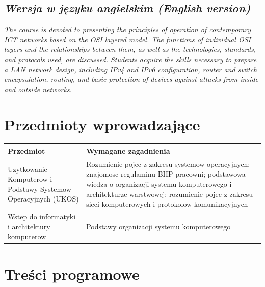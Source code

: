 \documentclass[12pt, a4paper]{article}
\newcommand{\thdrule}{\noalign{\global\setlength{\extrarowheight}{0pt}}}
\newcommand{\thdend}{\noalign{\global\setlength{\extrarowheight}{3pt}}}
\begin{document}
\subsection*{\textit{Wersja w języku angielskim (English version)}}

\textit{The course is devoted to presenting the principles of operation of contemporary ICT networks based on the OSI layered model. The functions of individual OSI layers and the relationships between them, as well as the technologies, standards, and protocols used, are discussed. Students acquire the skills necessary to prepare a LAN network design, including IPv4 and IPv6 configuration, router and switch encapsulation, routing, and basic protection of devices against attacks from inside and outside networks.}


\section{Przedmioty wprowadzające}

{\scriptsize
\begin{tabularx}{\textwidth}{m{5cm}Y}
\thdrule\toprule
{} {\color{white}\textbf{Przedmiot}} & {\color{white}\textbf{Wymagane zagadnienia}} \\
\midrule\thdend
   Uzytkowanie Komputerow i Podstawy Systemow Operacyjnych (UKOS) & Rozumienie pojec z zakresu systemow operacyjnych; znajomosc regulaminu BHP pracowni; podstawowa wiedza o organizacji systemu komputerowego i architekturze warstwowej; rozumienie pojec z zakresu sieci komputerowych i protokolow komunikacyjnych \\
   Wstep do informatyki i architektury komputerow & Podstawy organizacji systemu komputerowego \\
\bottomrule
\end{tabularx}}

\section{Treści programowe}
\end{document}
